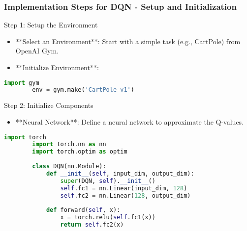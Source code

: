 \documentclass{beamer}
\begin{document}
\begin{frame}[fragile]
    \frametitle{Implementation Steps for DQN - Setup and Initialization}
    \begin{block}{Step 1: Setup the Environment}
        \begin{itemize}
            \item **Select an Environment**: Start with a simple task (e.g., CartPole) from OpenAI Gym.
            \item **Initialize Environment**:
        \end{itemize}
        \begin{lstlisting}[language=Python]
        import gym
        env = gym.make('CartPole-v1')
        \end{lstlisting}
    \end{block}
    
    \begin{block}{Step 2: Initialize Components}
        \begin{itemize}
            \item **Neural Network**: Define a neural network to approximate the Q-values.
        \end{itemize}
        \begin{lstlisting}[language=Python]
        import torch
        import torch.nn as nn
        import torch.optim as optim
        
        class DQN(nn.Module):
            def __init__(self, input_dim, output_dim):
                super(DQN, self).__init__()
                self.fc1 = nn.Linear(input_dim, 128)
                self.fc2 = nn.Linear(128, output_dim)
            
            def forward(self, x):
                x = torch.relu(self.fc1(x))
                return self.fc2(x)
        \end{lstlisting}
    \end{block}
\end{frame}
\end{document}
